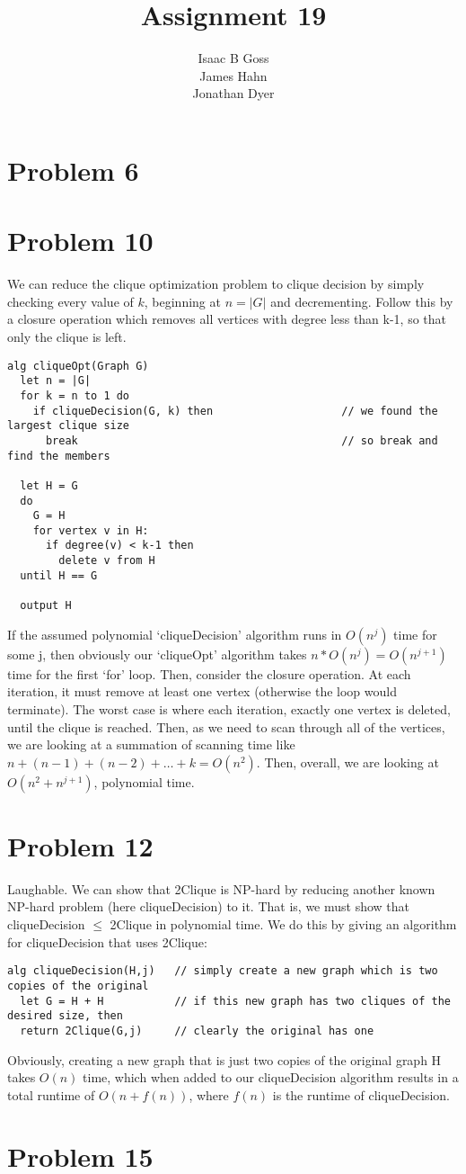 \documentclass{article}
\author{Isaac B Goss\\ James Hahn\\ Jonathan Dyer}
\title{Assignment 19}
\providecommand{\prob}[1]{\section*{Problem #1}}
\begin{document}
\maketitle
\prob{6}




\prob{10}
We can reduce the clique optimization problem to clique decision by simply checking every value of $k$,
beginning at $n = |G|$ and decrementing.
Follow this by a closure operation which removes all vertices with degree less than k-1,
so that only the clique is left.
\begin{lstlisting}
alg cliqueOpt(Graph G)
  let n = |G|
  for k = n to 1 do
    if cliqueDecision(G, k) then                    // we found the largest clique size
      break                                         // so break and find the members

  let H = G
  do
    G = H
    for vertex v in H:
      if degree(v) < k-1 then
        delete v from H
  until H == G

  output H
\end{lstlisting}
If the assumed polynomial `cliqueDecision' algorithm runs in $O(n^j)$ time for some j,
then obviously our `cliqueOpt' algorithm takes $n*O(n^j) = O(n^{j+1})$ time for the first `for' loop.
Then, consider the closure operation.
At each iteration, it must remove at least one vertex (otherwise the loop would terminate).
The worst case is where each iteration, exactly one vertex is deleted, until the clique is reached.
Then, as we need to scan through all of the vertices,
we are looking at a summation of scanning time like $n + (n-1) + (n-2) + \dots + k = O(n^2)$.
Then, overall, we are looking at $O(n^2 + n^{j+1})$, polynomial time.


\prob{12}
Laughable.
We can show that 2Clique is NP-hard by reducing another known NP-hard problem (here cliqueDecision) to it.
That is, we must show that cliqueDecision $\leq$ 2Clique in polynomial time.
We do this by giving an algorithm for cliqueDecision that uses 2Clique:
\begin{lstlisting}
alg cliqueDecision(H,j)   // simply create a new graph which is two copies of the original
  let G = H + H           // if this new graph has two cliques of the desired size, then
  return 2Clique(G,j)     // clearly the original has one
\end{lstlisting}
Obviously, creating a new graph that is just two copies of the original graph H takes $O(n)$ time, which when added to our cliqueDecision algorithm results in a total runtime of $O(n + f(n))$, where $f(n)$ is the runtime of cliqueDecision.
\prob{15}
\end{document}
